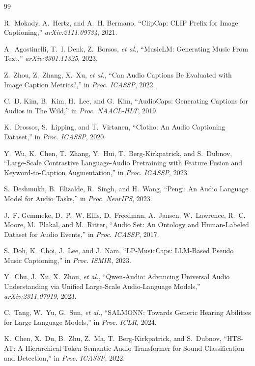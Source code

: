 \documentclass{article}
\begin{document}
{\small
\hypersetup{linkcolor=red}  %
\begin{thebibliography}{99}

R.~Mokady, A.~Hertz, and A.~H. Bermano,
``ClipCap: CLIP Prefix for Image Captioning,'' \emph{arXiv:2111.09734}, 2021.

A.~Agostinelli, T.~I. Denk, Z.~Borsos, \emph{et al.},
``MusicLM: Generating Music From Text,'' \emph{arXiv:2301.11325}, 2023.

Z.~Zhou, Z.~Zhang, X.~Xu, \emph{et al.},
``Can Audio Captions Be Evaluated with Image Caption Metrics?,'' in \emph{Proc. ICASSP}, 2022.

C.~D. Kim, B.~Kim, H.~Lee, and G.~Kim,
``AudioCaps: Generating Captions for Audios in The Wild,'' in \emph{Proc. NAACL-HLT}, 2019.

K.~Drossos, S.~Lipping, and T.~Virtanen,
``Clotho: An Audio Captioning Dataset,'' in \emph{Proc. ICASSP}, 2020.

Y.~Wu, K.~Chen, T.~Zhang, Y.~Hui, T.~Berg-Kirkpatrick, and S.~Dubnov,
``Large-Scale Contrastive Language-Audio Pretraining with Feature Fusion and
Keyword-to-Caption Augmentation,'' in \emph{Proc. ICASSP}, 2023.

S.~Deshmukh, B.~Elizalde, R.~Singh, and H.~Wang,
``Pengi: An Audio Language Model for Audio Tasks,'' in \emph{Proc. NeurIPS}, 2023.

J.~F. Gemmeke, D.~P.~W. Ellis, D.~Freedman, A.~Jansen, W.~Lawrence, R.~C. Moore,
M.~Plakal, and M.~Ritter,
``Audio Set: An Ontology and Human-Labeled Dataset for Audio Events,'' in \emph{Proc. ICASSP},
2017.

S.~Doh, K.~Choi, J.~Lee, and J.~Nam,
``LP-MusicCaps: LLM-Based Pseudo Music Captioning,'' in \emph{Proc. ISMIR}, 2023.

Y.~Chu, J.~Xu, X.~Zhou, \emph{et al.},
``Qwen-Audio: Advancing Universal Audio Understanding via Unified Large-Scale Audio-Language
Models,'' \emph{arXiv:2311.07919}, 2023.

C.~Tang, W.~Yu, G.~Sun, \emph{et al.},
``SALMONN: Towards Generic Hearing Abilities for Large Language Models,'' in \emph{Proc. ICLR},
2024.

K.~Chen, X.~Du, B.~Zhu, Z.~Ma, T.~Berg-Kirkpatrick, and S.~Dubnov,
``HTS-AT: A Hierarchical Token-Semantic Audio Transformer for Sound Classification and
Detection,'' in \emph{Proc. ICASSP}, 2022.


\end{thebibliography}}
\end{document}
